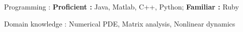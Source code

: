 


\begin{cvskills}


\cvskill
	{Programming : } 
	{\textbf{Proficient :}  Java, Matlab, C++, Python;
	\textbf{Familiar :} Ruby} 

\cvskill
	{Domain knowledge : }
	{Numerical PDE, Matrix analysis, Nonlinear dynamics}




\end{cvskills}
